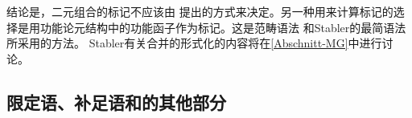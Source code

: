 结论是，二元组合的标记不应该由 \citet{Chomsky2008a,Chomsky2013a}提出的方式来决定。另一种用来计算标记的选择是用功能论元结构中的功能函子作为标记\citep[]{BE95a}。这是范畴语法\citep{Ajdukiewicz35a-u,Steedman2000a-u} 和Stabler的最简语法\citeyearpar{Stabler2010b}所采用的方法。 Stabler有关合并的形式化的内容将在\ref{Abschnitt-MG}中进行讨论。


\subsection{限定语、补足语和\xbartc 的其他部分}
\label{Abschnitt-Spezfikatoren-MP}

